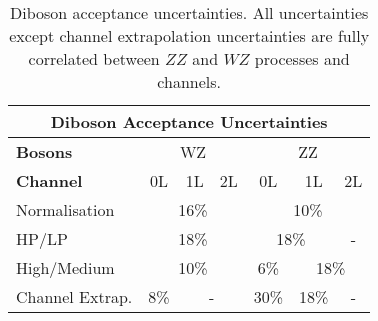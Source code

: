 \begin{table}[!htbp] 
    \footnotesize\centering
    \setlength{\tabcolsep}{0.5em} %
    \begin{tabular}{l|c|c|c|c|c|c}
    \toprule\hline
    \multicolumn{7}{c}{Diboson Acceptance Uncertainties}            
    \\ \hline
    \textbf{Bosons}     & \multicolumn{3}{c|}{{WZ}} & \multicolumn{3}{c}{{ZZ}} 
    \\ \hline
    \textbf{Channel}    &   0L      &   1L    &   2L    &   0L      &   1L      & 2L          
    \\ \hline
    Normalisation       &  \multicolumn{3}{c|}{{16\%}}    &  \multicolumn{3}{c}{{10\%}}
    \\ \hline
    HP/LP               &   \multicolumn{3}{c|}{{18\%}}   &   \multicolumn{2}{c|}{{18\%}}    &   -      
    \\ \hline
    High/Medium    &    \multicolumn{3}{c|}{{10\%}}     &    6\%    &    \multicolumn{2}{c}{{18\%}}
    \\ \hline
    Channel Extrap.     &   8\%    &   \multicolumn{2}{c|}{ - }     &    30\%      &    18\%      &   -
    \\ \hline\bottomrule
    \end{tabular}
    \caption{Diboson acceptance uncertainties. All uncertainties except channel extrapolation uncertainties are fully correlated between $ZZ$ and $WZ$ processes and channels.}
    \label{tab:diboson_acceptance_uncerts}
\end{table}
        